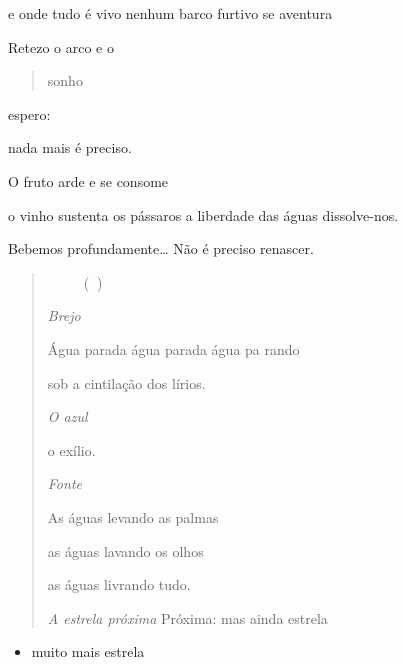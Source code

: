e onde tudo é vivo nenhum barco furtivo se aventura

Retezo o arco e o

\begin{quote}
sonho
\end{quote}

espero:

nada mais é preciso.

O fruto arde e se consome

o vinho sustenta os pássaros a liberdade das águas dissolve-nos.

Bebemos profundamente\ldots{} Não é preciso renascer.

\begin{quote}
 ()

\emph{Brejo}

Água parada água parada água pa rando

sob a cintilação dos lírios.

\emph{O azul}

o exílio.

\emph{Fonte}

As águas levando as palmas

as águas lavando os olhos

as águas livrando tudo.

\emph{A estrela próxima} Próxima: mas ainda estrela
\end{quote}

\begin{itemize}
\item
  muito mais estrela
\end{itemize}

